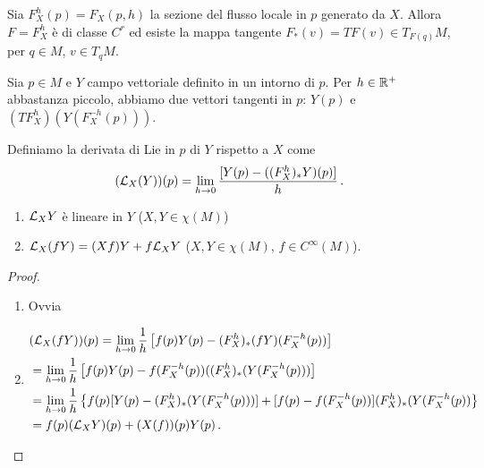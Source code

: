 Sia $F_X^h(p)=F_X(p,h)$ la sezione del flusso locale in $p$ generato da $X$. Allora $F=F_X^h$ è di classe $C^r$ ed esiste la mappa tangente $F_*(v)=TF(v)\in T_{F(q)}M$, per $q\in M$, $v\in T_qM$.

Sia $p\in M$ e $Y$ campo vettoriale definito in un intorno di $p$. Per $h\in\mathbb R^+$ abbastanza piccolo, abbiamo due vettori tangenti in $p$: $Y(p)$ e $(TF_X^h)(Y(F_X^{-h}(p)))$.

\begin{definition}
	Definiamo la derivata di Lie in $p$ di $Y$ rispetto a $X$ come \begin{equation*}(\mathcal L_X(Y))(p)=\lim_{h\to 0}\frac{[Y(p)-((F_X^h)_*Y)(p)]}h \, \text{. }
	\end{equation*}
\end{definition}

\begin{proposition}
	\begin{enumerate}
		\item $\mathcal L_XY$ è lineare in $Y$ ($X,Y\in\chi(M)$)
		\item $\mathcal L_X(fY)=(Xf)Y+f\mathcal L_XY$ ($X,Y\in\chi(M)$, $f\in C^\infty(M)$).
	\end{enumerate}
\end{proposition}

\begin{proof}
	\begin{enumerate}
	 \item Ovvia
	 \item 
	 \begin{equation*}
	 \begin{split}
	 &(\mathcal L_X(fY))(p)=\lim_{h\to 0} \frac 1h \left[f(p)Y(p)-(F_X^h)_*(fY)(F_X^{-h}(p))\right]\\
	 &=\lim_{h\to 0}\frac 1h \left[f(p)Y(p)-f(F_X^{-h}(p)) ((F_X^h)_*(Y(F_X^{-h}(p)))\right]\\
	 &=\lim_{h\to 0}\frac 1h \left\{f(p)[Y(p)-(F_X^h)_*(Y(F_X^{-h}(p)))]+[f(p)-f(F_X^{-h}(p))](F_X^h)_*(Y(F_X^{-h}(p))\right\}\\
	 &=f(p)(\mathcal L_XY)(p)+(X(f))(p)Y(p) \, \text{. }
	 \end{split}
	 \end{equation*}
	 \end{enumerate}

\end{proof}




